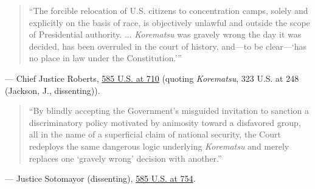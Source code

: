 \documentclass[12pt]{article}
\begin{document}
\begin{quote}
``The forcible relocation of U.S. citizens to concentration camps, solely and explicitly on the basis of race, is objectively unlawful and outside the scope of Presidential authority. ... \textit{Korematsu} was gravely wrong the day it was decided, has been overruled in the court of history, and---to be clear---`has no place in law under the Constitution.'''
\end{quote}
\noindent --- Chief Justice Roberts, \href{https://supreme.justia.com/cases/federal/us/585/17-965/}{585 U.S. at 710} (quoting \textit{Korematsu}, 323 U.S. at 248 (Jackson, J., dissenting)).

\begin{quote}
``By blindly accepting the Government's misguided invitation to sanction a discriminatory policy motivated by animosity toward a disfavored group, all in the name of a superficial claim of national security, the Court redeploys the same dangerous logic underlying \textit{Korematsu} and merely replaces one `gravely wrong' decision with another.''
\end{quote}
\noindent --- Justice Sotomayor (dissenting), \href{https://www.supremecourt.gov/opinions/17pdf/585us2r70_jgkn.pdf}{585 U.S. at 754}.
\end{document}
